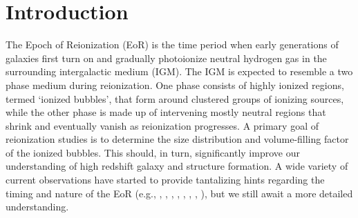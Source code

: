 

\ifpdf
    \graphicspath{{bubble_finding/figures/PNG/}{bubble_finding/figures/PDF/}{bubble_finding/figures/}}
\else
    \graphicspath{{bubble_finding/figures/EPS/}{example_chapter/figures/}}
\fi



\section{Introduction} \label{sec:intro}
 
The Epoch of Reionization (EoR) is the time period when early generations
of galaxies first turn on and gradually photoionize neutral hydrogen
gas in the surrounding intergalactic medium (IGM). The IGM
is expected to resemble a two phase medium during reionization.
One phase consists of highly ionized regions, termed `ionized bubbles', that form around clustered
groups of ionizing sources, while the other phase is made up of intervening mostly neutral regions that
shrink and eventually vanish as reionization progresses. A primary goal
of reionization studies is to determine the size distribution and volume-filling factor of
the ionized bubbles. This should, in turn, significantly improve our understanding of high
redshift galaxy and structure formation. 
A wide variety of current
observations have started to provide tantalizing hints regarding the timing and nature of the EoR (e.g., \citealt{Fan:2005es}, \citealt{Totani:2005ng}, 
\citealt{Dunkley:2008ie}, \citealt{Ouchi:2010}, \citealt{Bouwens:2011xu}, \citealt{Mortlock:2011va}, \citealt{Zahn:2011vp}, \citealt{Schenker:2011ea}),
but we still await a more detailed understanding. 

